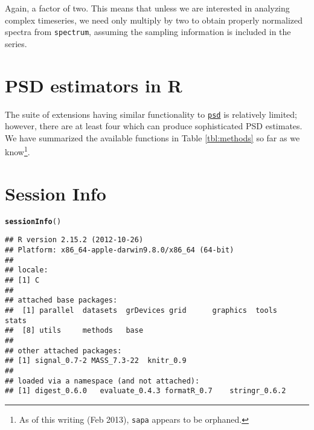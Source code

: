 \documentclass[11pt]{article}\usepackage{graphicx, color}
\makeatletter
\newcommand{\hlfunctioncall}[1]{\textcolor[rgb]{0.501960784313725,0,0.329411764705882}{\textbf{#1}}}%
\newenvironment{kframe}{%
 \def\at@end@of@kframe{}%
 \ifinner\ifhmode%
  \def\at@end@of@kframe{\end{minipage}}%
  \begin{minipage}{\columnwidth}%
 \fi\fi%
 \def\FrameCommand##1{\hskip\@totalleftmargin \hskip-\fboxsep
 \colorbox{shadecolor}{##1}\hskip-\fboxsep
     \hskip-\linewidth \hskip-\@totalleftmargin \hskip\columnwidth}%
 \MakeFramed {\advance\hsize-\width
   \@totalleftmargin\z@ \linewidth\hsize
   \@setminipage}}%
 {\par\unskip\endMakeFramed%
 \at@end@of@kframe}
\newenvironment{knitrout}{}{} %
\newcommand{\Rcmd}[1]{\texttt{#1}}
\newcommand{\psd}[0]{\href{http://abarbour.github.com/psd/}{\color{blue}\Rcmd{psd}}}
\makeatother
\begin{document}
Again, a factor of two. 
This means that unless we are interested in analyzing complex
timeseries, we need only multiply by two 
to obtain properly normalized spectra
from \Rcmd{spectrum}, 
assuming the sampling information is included in the series.

\section{PSD estimators in R}
The suite of extensions having
similar functionality to \psd{}
is relatively limited; however, there are at least four which
can produce sophisticated PSD estimates.   We have
summarized the available functions in Table \ref{tbl:methods}
so far as we know\footnote{
As of this writing (Feb 2013), \Rcmd{sapa} appears to be orphaned.
}.



\pagebreak
\section*{Session Info}
\begin{knitrout}
\color{fgcolor}\begin{kframe}
\begin{alltt}
\hlfunctioncall{sessionInfo}()
\end{alltt}
\begin{verbatim}
## R version 2.15.2 (2012-10-26)
## Platform: x86_64-apple-darwin9.8.0/x86_64 (64-bit)
## 
## locale:
## [1] C
## 
## attached base packages:
##  [1] parallel  datasets  grDevices grid      graphics  tools     stats    
##  [8] utils     methods   base     
## 
## other attached packages:
## [1] signal_0.7-2 MASS_7.3-22  knitr_0.9   
## 
## loaded via a namespace (and not attached):
## [1] digest_0.6.0   evaluate_0.4.3 formatR_0.7    stringr_0.6.2
\end{verbatim}
\end{kframe}
\end{knitrout}






\printindex
\end{document}
